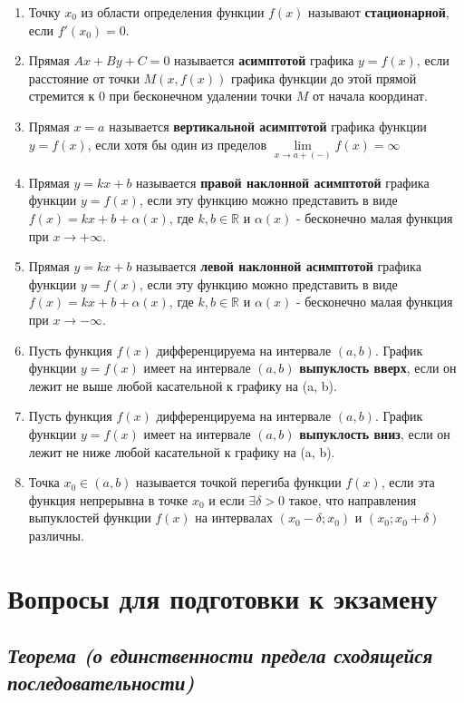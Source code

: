 \begin{enumerate}
\item Точку $x_0$ из области определения функции $f(x)$ называют \textbf{стационарной}, если $f'(x_0) = 0$.
\item Прямая $Ax + By + C = 0$ называется \textbf{асимптотой} графика $y = f(x)$, если расстояние от точки $M(x, f(x))$ графика функции до этой прямой стремится к 0 при бесконечном удалении точки $M$ от начала координат.
\item Прямая $x = a$ называется \textbf{вертикальной асимптотой} графика функции $y = f(x)$, если хотя бы один из пределов $\lim\limits_{x \to a+(-)}f(x) = \infty$
\item Прямая $y = kx + b$ называется \textbf{правой наклонной асимптотой} графика функции $y = f(x)$, если эту функцию можно представить в виде $f(x) = kx + b + \alpha(x)$, где $k, b \in \mathbb{R}$ и $\alpha(x)$ - бесконечно малая функция при $x \rightarrow +\infty$.
\item Прямая $y = kx + b$ называется \textbf{левой наклонной асимптотой} графика функции $y = f(x)$, если эту функцию можно представить в виде $f(x) = kx + b + \alpha(x)$, где $k, b \in \mathbb{R}$ и $\alpha(x)$ - бесконечно малая функция при $x \rightarrow -\infty$.
\item Пусть функция $f(x)$ дифференцируема на интервале $(a, b)$. График функции $y = f(x)$ имеет на интервале $(a, b)$ \textbf{выпуклость вверх}, если он лежит не выше любой касательной к графику на (a, b).
\item Пусть функция $f(x)$ дифференцируема на интервале $(a, b)$. График функции $y = f(x)$ имеет на интервале $(a, b)$ \textbf{выпуклость вниз}, если он лежит не ниже любой касательной к графику на (a, b).
\item Точка $x_0 \in (a,b)$ называется точкой перегиба функции $f(x)$, если эта функция непрерывна в точке $x_0$ и если $\exists \delta > 0$ такое, что направления выпуклостей функции $f(x)$ на интервалах $(x_0-\delta; x_0)$ и $(x_0; x_0+\delta)$ различны.

\end{enumerate}
\section{Вопросы для подготовки к экзамену}
\subsection{\textit{Теорема (о единственности предела сходящейся последовательности)}}

